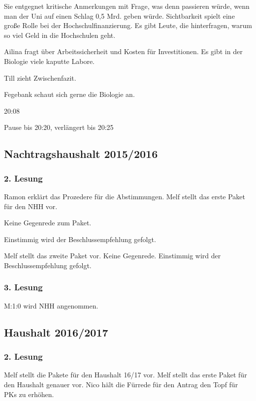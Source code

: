 \documentclass[ngerman,headheight=70pt]{scrartcl}
\begin{document}
    Sie entgegnet kritische Anmerkungen mit Frage, was denn passieren würde, wenn
    man der Uni auf einen Schlag 0,5 Mrd. geben würde.
    Sichtbarkeit spielt eine große Rolle bei der Hochschulfinanzierung.
    Es gibt Leute, die hinterfragen, warum so viel Geld in die Hochschulen
    geht.

    Ailina fragt über Arbeitssicherheit und Kosten für Investitionen.
    Es gibt in der Biologie viele kaputte Labore.

    Till zieht Zwischenfazit.

    Fegebank schaut sich gerne die Biologie an.

    20:08

    Pause bis 20:20, verlängert bis 20:25

    \subsection{Nachtragshaushalt 2015/2016}
    \subsubsection{2. Lesung}

    Ramon erklärt das Prozedere für die Abstimmungen. Melf stellt das erste
    Paket für den NHH vor.

    Keine Gegenrede zum Paket.

    Einstimmig wird der Beschlussempfehlung gefolgt.

    Melf stellt das zweite Paket vor. Keine Gegenrede. Einstimmig wird der
    Beschlussempfehlung gefolgt.

    \subsubsection{3. Lesung}

    M:1:0 wird NHH angenommen.

    \subsection{Haushalt 2016/2017}

    \subsubsection{2. Lesung}

    Melf stellt die Pakete für den Haushalt 16/17 vor. Melf stellt das erste
    Paket für den Haushalt genauer vor. Nico hält die Fürrede für den Antrag
    den Topf für PKs zu erhöhen.
\end{document}
